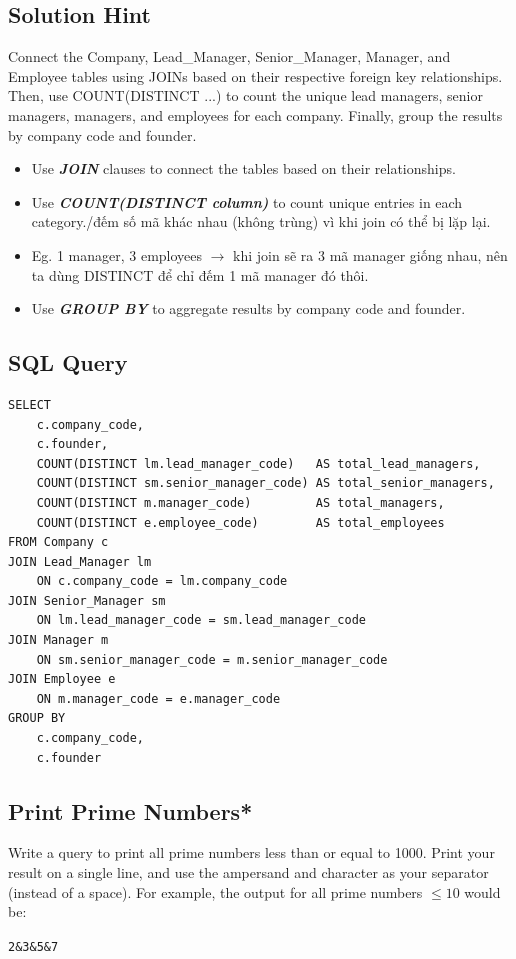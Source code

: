 \documentclass[12pt,a4paper]{article}
\begin{document}
\subsection*{Solution Hint}
Connect the Company, Lead\_Manager, Senior\_Manager, Manager, and Employee tables using JOINs based on their respective foreign key relationships. 
Then, use COUNT(DISTINCT ...) to count the unique lead managers, senior managers, managers, and employees for each company. Finally, group the results by company code and founder.
\begin{itemize}
    \item Use \textit{\textbf{JOIN}} clauses to connect the tables based on their relationships.
    \item Use \textit{\textbf{COUNT(DISTINCT column)}} to count unique entries in each category./đếm số mã khác nhau (không trùng) vì khi join có thể bị lặp lại.
    \item Eg. 1 manager, 3 employees $\rightarrow$ khi join sẽ ra 3 mã manager giống nhau, nên ta dùng DISTINCT để chỉ đếm 1 mã manager đó thôi.
    \item Use \textit{\textbf{GROUP BY}} to aggregate results by company code and founder.
\end{itemize}
\subsection*{SQL Query}
\begin{lstlisting}[style=sqlstyle]
SELECT
    c.company_code,
    c.founder,
    COUNT(DISTINCT lm.lead_manager_code)   AS total_lead_managers,
    COUNT(DISTINCT sm.senior_manager_code) AS total_senior_managers,
    COUNT(DISTINCT m.manager_code)         AS total_managers,
    COUNT(DISTINCT e.employee_code)        AS total_employees
FROM Company c
JOIN Lead_Manager lm
    ON c.company_code = lm.company_code
JOIN Senior_Manager sm
    ON lm.lead_manager_code = sm.lead_manager_code
JOIN Manager m
    ON sm.senior_manager_code = m.senior_manager_code
JOIN Employee e
    ON m.manager_code = e.manager_code
GROUP BY
    c.company_code,
    c.founder
\end{lstlisting}
\subsection{Print Prime Numbers*}
Write a query to print all prime numbers less than or equal to 1000. 
Print your result on a single line, and use the ampersand and character as your separator (instead of a space).\newline
For example, the output for all prime numbers $\leqslant 10$ would be:
\begin{center}
    \texttt{2\&3\&5\&7} 
\end{center}
\end{document}
